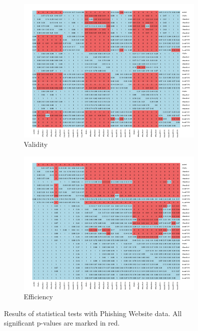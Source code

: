 \documentclass[main]{subfiles}
\begin{document}
\begin{figure}[!h]
\centering
\begin{subfigure}{.5\textwidth}
  \centering
  \includegraphics[width=\linewidth]{images/heatmapPhish}
  \caption{Validity}
  \label{fig:valPhish}
\end{subfigure}%
\begin{subfigure}{.5\textwidth}
  \centering
  \includegraphics[width=\linewidth]{images/heatmapPhish_eff}
  \caption{Efficiency}
  \label{fig:effPhish}
\end{subfigure}%
\caption{Results of statistical tests with Phishing Website data. All significant p-values are marked in red.} \label{fig:testPhish}
\end{figure}
\end{document}
